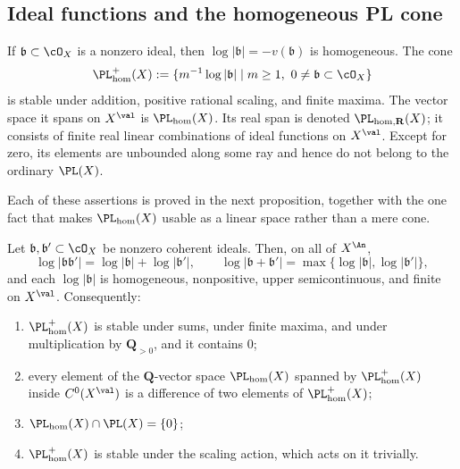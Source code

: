 \subsection{Ideal functions and the homogeneous PL cone}
\label{sec:ch35-hom-pl}

If $\mathfrak b\subset\cO_X$ is a nonzero ideal, then
$\log|\mathfrak b|=-v(\mathfrak b)$ is homogeneous.  The cone
\begin{equation}
\label{eq:positive-homogeneous-pl}
 \PL_{\mathrm{hom}}^+(X)
 :=\{m^{-1}\log|\mathfrak b|\mid m\geq1,\ 0\ne\mathfrak b\subset\cO_X\}
\end{equation}
is stable under addition, positive rational scaling, and finite maxima.
The vector space it spans on $X^{\val}$ is
$\PL_{\mathrm{hom}}(X)$. Its real span is denoted
$\PL_{\mathrm{hom},\mathbf R}(X)$; it consists of finite real linear
combinations of ideal functions on $X^{\val}$. Except for zero, its elements are unbounded
along some ray and hence do not belong to the ordinary $\PL(X)$.

Each of these assertions is proved in the next proposition, together with
the one fact that makes $\PL_{\mathrm{hom}}(X)$ usable as a linear space
rather than a mere cone.

\begin{proposition}
\label{prop:ch35-hom-pl-semiring}
Let $\mathfrak b,\mathfrak b'\subset\cO_X$ be nonzero coherent ideals.
Then, on all of $X^{\An}$,
\begin{equation}
\label{eq:ch35-ideal-tropical}
 \log|\mathfrak b\mathfrak b'|
   =\log|\mathfrak b|+\log|\mathfrak b'|,
 \qquad
 \log|\mathfrak b+\mathfrak b'|
   =\max\{\log|\mathfrak b|,\log|\mathfrak b'|\},
\end{equation}
and each $\log|\mathfrak b|$ is homogeneous, nonpositive, upper
semicontinuous, and finite on $X^{\val}$.  Consequently:
\begin{enumerate}
\item $\PL_{\mathrm{hom}}^+(X)$ is stable under sums, under finite maxima,
 and under multiplication by $\mathbf Q_{>0}$, and it contains $0$;
\item every element of the $\mathbf Q$-vector space
 $\PL_{\mathrm{hom}}(X)$ spanned by
 $\PL_{\mathrm{hom}}^+(X)$ inside $C^0(X^{\val})$ is a difference of two
 elements of $\PL_{\mathrm{hom}}^+(X)$;
\item $\PL_{\mathrm{hom}}(X)\cap\PL(X)=\{0\}$;
\item $\PL_{\mathrm{hom}}^+(X)$ is stable under the scaling action, which
 acts on it trivially.
\end{enumerate}
\par
\end{proposition}


